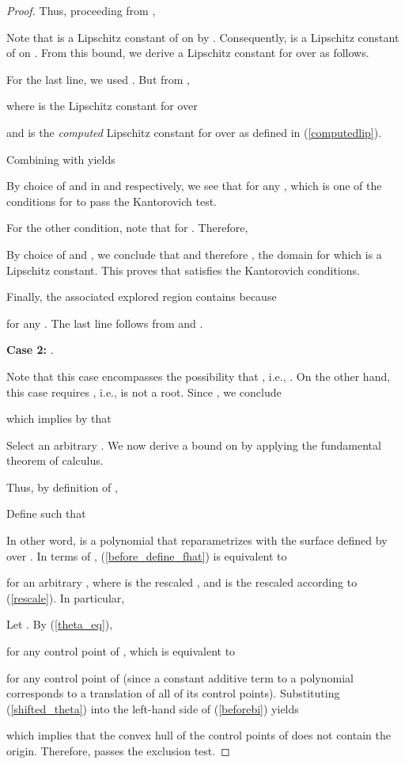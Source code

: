 \documentclass{article}
\newcommand\eref[1]{}
\begin{document}
\begin{proof}
Thus, proceeding from \eref{eta_ineq},



Note that  is a Lipschitz
constant of  on  by \eref{eq:exLip}.  Consequently,  is a Lipschitz
constant of   on . From this bound,
we derive a Lipschitz constant
 for
  over  as follows.

For the last line, we used
\eref{eq:exLip}.
But from \eref{hodef},

where  is the Lipschitz constant for  over

and  is the \emph{computed} Lipschitz constant for
 over  as defined in (\ref{computedlip}).

Combining \eref{eq:etabound} with
\eref{eq:omegahat} yields

By choice of  and  in \eref{eq:k0def} and \eref{eq:k1def}
respectively, we see that 
for any , which is one of the conditions
for  to pass the Kantorovich test.

For the other condition, note that  for . Therefore,

By choice of  and , we conclude that  and
therefore , the domain for which  is
a Lipschitz constant.
This proves that  satisfies the Kantorovich conditions.

Finally, the associated explored region  contains  because

for any .
The last line follows from \eref{eq:k0def} and \eref{eq:rbdcase1}.

\begin{flushleft} \textbf{Case 2: } .
\end{flushleft}
Note that this case encompasses the possibility that ,
i.e., .  On the other hand, this case requires
, i.e.,  is not a root.
Since , we conclude

which implies by \eref{deltahatcond} that

Select an arbitrary .  
We now derive a bound on  by
applying the fundamental theorem
of calculus.

Thus, by definition of ,

Define  such that

In other word,  is a polynomial that
reparametrizes with  the surface defined by  over .
In terms of , (\ref{before_define_fhat}) is equivalent to

for an arbitrary , where  is the rescaled
, and  is the rescaled  according to
(\ref{rescale}). In particular,

Let . 
By (\ref{theta_eq}),

for any control point  of , which is
equivalent to

for any control point  of  (since a constant
additive term to a polynomial corresponds to a translation of all of
its control points). Substituting
(\ref{shifted_theta}) into the left-hand side of (\ref{beforebi})
yields

which implies that the convex hull of the control points of
 does not contain the origin. 
Therefore,  passes the exclusion test.
\end{proof}
\end{document}
